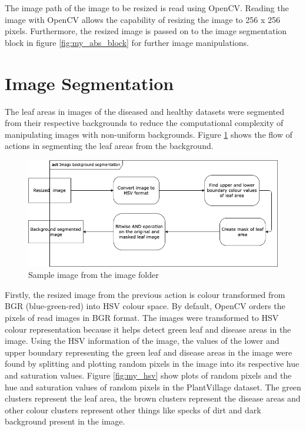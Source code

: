 The image path of the image to be resized is read using OpenCV. Reading the image with OpenCV allows the capability of resizing the image to 256 x 256 pixels. Furthermore, the resized image is passed on to the image segmentation block in figure \ref{fig:my_abs_block} for further image manipulations.

\section{Image Segmentation}
The leaf areas in images of the diseased and healthy datasets were segmented from their respective backgrounds to reduce the computational complexity of manipulating images with non-uniform backgrounds. Figure \ref{fig:my_act2} shows the flow of actions in segmenting the leaf areas from the background.
\begin{figure}[!htb]
    \centering
    \includegraphics[scale=0.55, keepaspectratio]{Figures/act2.png}
    \caption{Sample image from the image folder}
    \label{fig:my_act2}
\end{figure}

Firstly, the resized image from the previous action is colour transformed from BGR (blue-green-red) into HSV colour space. By default, OpenCV orders the pixels of read images in BGR format. The images were transformed to HSV colour representation because it helps detect green leaf and disease areas in the image. Using the HSV information of the image, the values of the lower and upper boundary representing the green leaf and disease areas in the image were found by splitting and plotting random pixels in the image into its respective hue and saturation values. Figure \ref{fig:my_hsv} show plots of random pixels and the hue and saturation values of random pixels in the PlantVillage dataset. The green clusters represent the leaf area, the brown clusters represent the disease areas and other colour clusters represent other things like specks of dirt and dark background present in the image.

